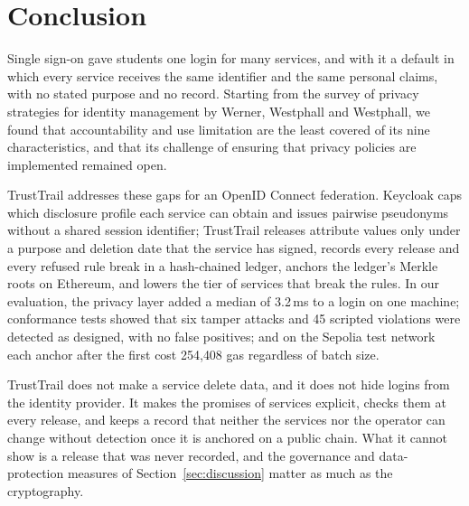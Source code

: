 \section{Conclusion}
\label{sec:conclusion}

Single sign-on gave students one login for many services, and with it a default in which every service receives the same identifier and the same personal claims, with no stated purpose and no record. Starting from the survey of privacy strategies for identity management by Werner, Westphall and Westphall, we found that accountability and use limitation are the least covered of its nine characteristics, and that its challenge of ensuring that privacy policies are implemented remained open.

TrustTrail addresses these gaps for an OpenID Connect federation. Keycloak caps which disclosure profile each service can obtain and issues pairwise pseudonyms without a shared session identifier; TrustTrail releases attribute values only under a purpose and deletion date that the service has signed, records every release and every refused rule break in a hash-chained ledger, anchors the ledger's Merkle roots on Ethereum, and lowers the tier of services that break the rules. In our evaluation, the privacy layer added a median of 3.2\,ms to a login on one machine; conformance tests showed that six tamper attacks and 45 scripted violations were detected as designed, with no false positives; and on the Sepolia test network each anchor after the first cost 254{,}408 gas regardless of batch size.

TrustTrail does not make a service delete data, and it does not hide logins from the identity provider. It makes the promises of services explicit, checks them at every release, and keeps a record that neither the services nor the operator can change without detection once it is anchored on a public chain. What it cannot show is a release that was never recorded, and the governance and data-protection measures of Section~\ref{sec:discussion} matter as much as the cryptography.
